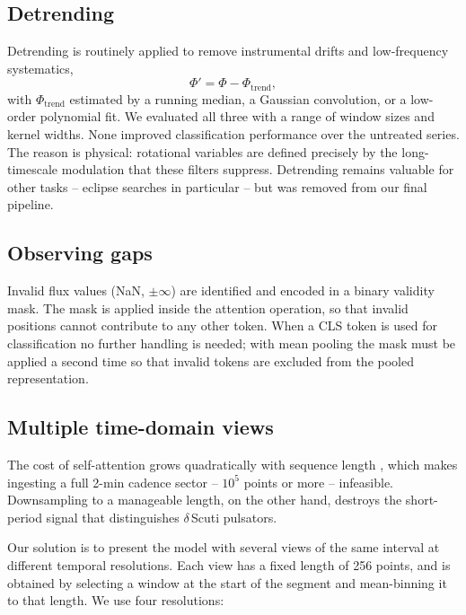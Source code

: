 \documentclass{aa}
\begin{document}
    \subsection{Detrending}

    Detrending is routinely applied to remove instrumental drifts and low-frequency
    systematics,
    \begin{equation}
        \Phi' = \Phi - \Phi_{\mathrm{trend}} ,
    \end{equation}
    with $\Phi_{\mathrm{trend}}$ estimated by a running median, a Gaussian convolution, or a
    low-order polynomial fit. We evaluated all three with a range of window sizes and
    kernel widths. None improved classification performance over the untreated series.
    The reason is physical: rotational variables are defined precisely by the long-timescale
    modulation that these filters suppress. Detrending remains valuable for other tasks --
    eclipse searches in particular -- but was removed from our final pipeline.

    \subsection{Observing gaps}

    Invalid flux values (NaN, $\pm\infty$) are identified and encoded in a binary validity
    mask. The mask is applied inside the attention operation, so that invalid positions
    cannot contribute to any other token. When a CLS token is used for classification no
    further handling is needed; with mean pooling the mask must be applied a second time so
    that invalid tokens are excluded from the pooled representation.

    \subsection{Multiple time-domain views}
    \label{sec:views}

    The cost of self-attention grows quadratically with sequence length
    \citep{Vaswani2017}, which makes ingesting a full 2-min cadence sector -- $10^5$ points
    or more -- infeasible. Downsampling to a manageable length, on the other hand, destroys
    the short-period signal that distinguishes $\delta$\,Scuti pulsators.

    Our solution is to present the model with several views of the same interval at different
    temporal resolutions. Each view has a fixed length of 256 points, and is obtained by
    selecting a window at the start of the segment and mean-binning it to that length. We use
    four resolutions:
\end{document}
